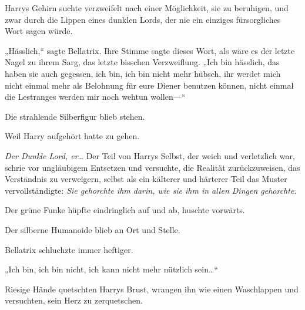 Harrys Gehirn suchte verzweifelt nach einer Möglichkeit, sie zu beruhigen, und zwar durch die Lippen eines dunklen Lords, der nie ein einziges fürsorgliches Wort sagen würde.

„Hässlich,“ sagte Bellatrix. Ihre Stimme sagte dieses Wort, als wäre es der letzte Nagel zu ihrem Sarg, das letzte bisschen Verzweiflung. „Ich bin hässlich, das haben sie auch gegessen, ich bin, ich bin nicht mehr hübsch, ihr werdet mich nicht einmal mehr als Belohnung für eure Diener benutzen können, nicht einmal die Lestranges werden mir noch wehtun wollen—“

Die strahlende Silberfigur blieb stehen.

Weil Harry aufgehört hatte zu gehen.

\emph{Der Dunkle Lord, er}… Der Teil von Harrys Selbst, der weich und verletzlich war, schrie vor ungläubigem Entsetzen und versuchte, die Realität zurückzuweisen, das Verständnis zu verweigern, selbst als ein kälterer und härterer Teil das Muster vervollständigte: \emph{Sie gehorchte ihm darin, wie sie ihm in allen Dingen gehorchte.}

Der grüne Funke hüpfte eindringlich auf und ab, huschte vorwärts.

Der silberne Humanoide blieb an Ort und Stelle.

Bellatrix schluchzte immer heftiger.

„Ich bin, ich bin nicht, ich kann nicht mehr nützlich sein…“

Riesige Hände quetschten Harrys Brust, wrangen ihn wie einen Waschlappen und versuchten, sein Herz zu zerquetschen.

